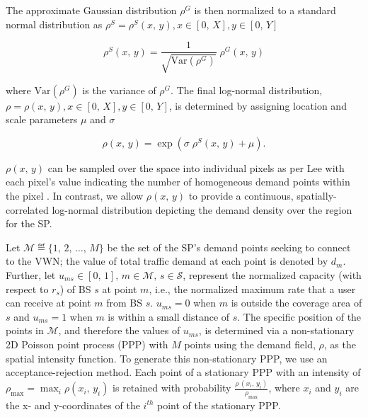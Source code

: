 \documentclass[conference]{IEEEtran}
\begin{document}
The approximate Gaussian distribution $\rho^G$ is then normalized to a standard normal distribution as $\rho^S = \rho^S\left(x,\, y\right), x \in [0,\, X], y \in [0,\, Y]$

\begin{equation}
\rho^S\left(x,\, y\right) = \frac{1}{\sqrt{\text{Var}\left(\rho^G\right)}} \; \rho^G\left(x,\, y\right)
\end{equation} \label{eq:rhoS}

\noindent where $\text{Var}\left(\rho^G\right)$ is the variance of $\rho^G$.  The final log-normal distribution, $\rho = \rho\left(x,\, y\right), x \in [0,\, X], y \in [0,\, Y]$, is determined by assigning location and scale parameters $\mu$ and $\sigma$

\begin{equation}
\rho\left(x,\, y\right) = \exp\left(\sigma \; \rho^S\left(x,\, y\right)+\mu\right).
\end{equation} \label{eq:rhoLN}

$\rho\left(x,\, y\right)$ can be sampled over the space into individual pixels as per Lee with each pixel's value indicating the number of homogeneous demand points within the pixel \cite{6554749}.  In contrast, we allow $\rho\left(x,\, y\right)$ to provide a continuous, spatially-correlated log-normal distribution depicting the demand density over the region for the SP.

Let $\mathcal{M} \eqdef \{1,\, 2,\, \ldots,\, M\}$ be the set of the SP's demand points seeking to connect to the VWN; the value of total traffic demand at each point is denoted by $d_m$.  Further, let $u_{ms} \in [0,\, 1],\, m \in \mathcal{M},\, s \in \mathcal{S}$, represent the normalized capacity (with respect to $r_s$) of BS $s$ at point $m$, i.e., the normalized maximum rate that a user can receive at point $m$ from BS $s$.  $u_{ms} = 0$ when $m$ is outside the coverage area of $s$ and $u_{ms} = 1$ when $m$ is within a small distance of $s$.  The specific position of the points in $\mathcal{M}$, and therefore the values of $u_{ms}$, is determined via a non-stationary 2D Poisson point process (PPP) with $M$ points using the demand field, $\rho$, as the spatial intensity function.  To generate this non-stationary PPP, we use an acceptance-rejection method.  Each point of a stationary PPP with an intensity of $\rho_{\max} = \max_i\rho\left(x_i,\, y_i\right)$ is retained with probability $\frac{\rho\,\left(x_i,\, y_i\right)}{\rho_{\max}}$, where $x_i$ and $y_i$ are the x- and y-coordinates of the $i^{th}$ point of the stationary PPP.
\end{document}
